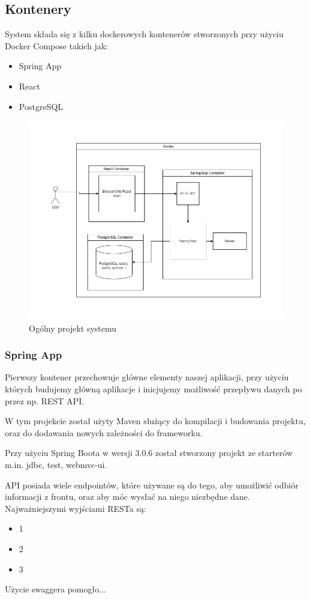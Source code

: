 \documentclass[]{article}
\begin{document}
\subsection{Kontenery}
System składa się z kilku dockerowych kontenerów stworzonych przy użyciu Docker Compose takich jak:
\begin{itemize}
	\item Spring App
	\item React
	\item PostgreSQL
\end{itemize}
\begin{figure}[h]
	\centering
	\includegraphics[scale=0.45]{ogolny_projekt.png}
	\caption{Ogólny projekt systemu}
\end{figure}
\subsubsection{Spring App}
Pierwszy kontener przechowuje główne elementy naszej aplikacji, przy użyciu których budujemy główną aplikacje i inicjujemy możliwość przepływu danych po przez np. REST API.

W tym projekcie został użyty Maven służący do kompilacji i budowania projektu, oraz do dodawania nowych zależności do frameworku.

Przy użyciu Spring Boota w wersji 3.0.6 został stworzony projekt ze starterów m.in. jdbc, test, webmvc-ui.

API posiada wiele endpointów, które używane są do tego, aby umożliwić odbiór informacji z frontu, oraz aby móc wysłać na niego niezbędne dane.
Najważniejszymi wyjściami RESTa są:
\begin{itemize}
	\item 1
	\item 2
	\item 3
\end{itemize}
Użycie swaggera pomogło...
\end{document}
